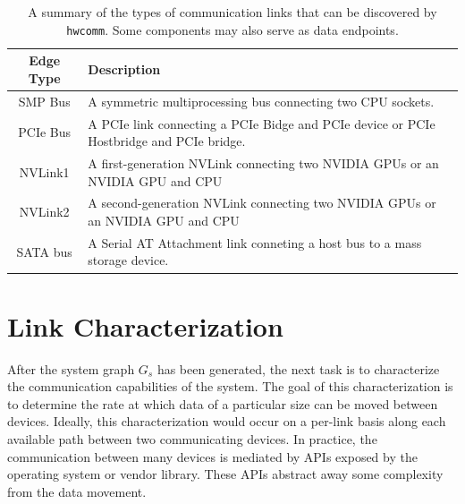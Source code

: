 \begin{table}[]
    \centering
    \caption[Discoverable edge types]{
        A summary of the types of communication links that can be discovered by \texttt{hwcomm}.
        Some components may also serve as data endpoints.
    }
    \label{tab:topology-edges}
    \begin{tabularx}{\linewidth}{ |c | >{\centering\arraybackslash}X |}
    \hline
    \textbf{Edge Type} & \textbf{Description} \\ \hline
    SMP Bus            & A symmetric multiprocessing bus connecting two CPU sockets. \\ \hline
    PCIe Bus           & A PCIe link connecting a PCIe Bidge and PCIe device or PCIe Hostbridge and PCIe bridge. \\ \hline
    NVLink1            & A first-generation NVLink connecting two NVIDIA GPUs or an NVIDIA GPU and CPU \\ \hline
    NVLink2            & A second-generation NVLink connecting two NVIDIA GPUs or an NVIDIA GPU and CPU \\ \hline
    SATA bus           & A Serial AT Attachment link conneting a host bus to a mass storage device. \\ \hline
    \end{tabularx}
\end{table}



%
%
\section{Link Characterization}
\label{sec:link-char}

After the system graph $G_s$ has been generated, the next task is to characterize the communication capabilities of the system.
The goal of this characterization is to determine the rate at which data of a particular size can be moved between devices.
Ideally, this characterization would occur on a per-link basis along each available path between two communicating devices.
In practice, the communication between many devices is mediated by APIs exposed by the operating system or vendor library.
These APIs abstract away some complexity from the data movement.

